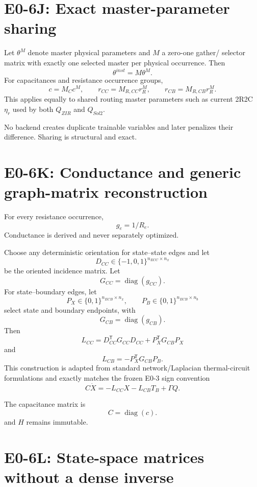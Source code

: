 \documentclass[11pt]{article}
\newcommand{\diagmat}{\operatorname{diag}}
\begin{document}
\section{E0-6J: Exact master-parameter sharing}

Let $\theta^M$ denote master physical parameters and $M$ a zero-one gather/
selector matrix with exactly one selected master per physical occurrence. Then
\[
\boxed{\theta^{inst}=M\theta^M.}
\]
For capacitances and resistance occurrence groups,
\[
c=M_Cc^M,\qquad
r_{CC}=M_{R,CC}r_R^M,\qquad
r_{CB}=M_{R,CB}r_R^M.
\]
This applies equally to shared routing master parameters such as current 2R2C
$\eta_r$ used by both $Q_{ZIR}$ and $Q_{Sol2}$.

No backend creates duplicate trainable variables and later penalizes their
difference. Sharing is structural and exact.

\section{E0-6K: Conductance and generic graph-matrix reconstruction}

For every resistance occurrence,
\[
\boxed{g_e=1/R_e.}
\]
Conductance is derived and never separately optimized.

Choose any deterministic orientation for state--state edges and let
\[
D_{CC}\in\{-1,0,1\}^{n_{ECC}\times n_x}
\]
be the oriented incidence matrix. Let
\[
G_{CC}=\diagmat(g_{CC}).
\]
For state--boundary edges, let
\[
P_X\in\{0,1\}^{n_{ECB}\times n_x},\qquad
P_B\in\{0,1\}^{n_{ECB}\times n_b}
\]
select state and boundary endpoints, with
\[
G_{CB}=\diagmat(g_{CB}).
\]
Then
\[
\boxed{
L_{CC}=D_{CC}^{\mathsf T}G_{CC}D_{CC}
+P_X^{\mathsf T}G_{CB}P_X
}
\]
and
\[
\boxed{
L_{CB}=-P_X^{\mathsf T}G_{CB}P_B.
}
\]
This construction is adapted from standard network/Laplacian thermal-circuit
formulations \cite{GhiausAhmad2020ThermalCircuits} and exactly matches the frozen
E0-3 sign convention
\[
C\dot X=-L_{CC}X-L_{CB}T_B+\Gamma Q.
\]

The capacitance matrix is
\[
\boxed{C=\diagmat(c).}
\]
and $H$ remains immutable.

\section{E0-6L: State-space matrices without a dense inverse}
\end{document}
